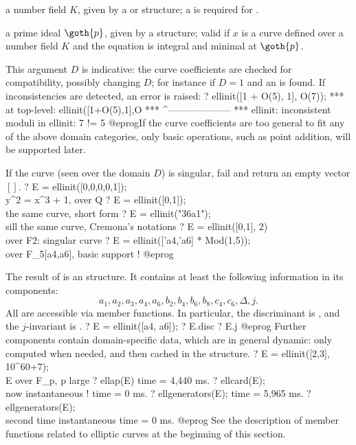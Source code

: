 \item a number field $K$, given by a  or  structure; a
 is required for .

\item a prime ideal $\goth{p}$, given by a  structure; valid if
$x$ is a curve defined over a number field $K$ and the equation is integral
and minimal at $\goth{p}$.

This argument $D$ is indicative: the curve coefficients are checked for
compatibility, possibly changing $D$; for instance if $D = 1$ and
an  is found. If inconsistencies are detected, an error is
raised:
\bprog
? ellinit([1 + O(5), 1], O(7));
 ***   at top-level: ellinit([1+O(5),1],O
 ***                 ^--------------------
 *** ellinit: inconsistent moduli in ellinit: 7 != 5
@eprog\noindent If the curve coefficients are too general to fit any of the
above domain categories, only basic operations, such as point addition, will
be supported later.

If the curve (seen over the domain $D$) is singular, fail and return an
empty vector $[]$.
\bprog
? E = ellinit([0,0,0,0,1]); \\ y^2 = x^3 + 1, over Q
? E = ellinit([0,1]);       \\ the same curve, short form
? E = ellinit("36a1");      \\ sill the same curve, Cremona's notations
? E = ellinit([0,1], 2)     \\ over F2: singular curve
? E = ellinit(['a4,'a6] * Mod(1,5));  \\ over F_5[a4,a6], basic support !
@eprog\noindent

The result of  is an  structure. It contains at least
the following information in its components:
%
$$ a_1,a_2,a_3,a_4,a_6,b_2,b_4,b_6,b_8,c_4,c_6,\Delta,j.$$
%
All are accessible via member functions. In particular, the discriminant is
, and the $j$-invariant is .
\bprog
? E = ellinit([a4, a6]);
? E.disc
? E.j
@eprog
Further components contain domain-specific data, which are in general dynamic:
only computed when needed, and then cached in the structure.
\bprog
? E = ellinit([2,3], 10^60+7);  \\ E over F_p, p large
? ellap(E)
time = 4,440 ms.
? ellcard(E);  \\ now instantaneous !
time = 0 ms.
? ellgenerators(E);
time = 5,965 ms.
? ellgenerators(E); \\ second time instantaneous
time = 0 ms.
@eprog
See the description of member functions related to elliptic curves at the
beginning of this section.

